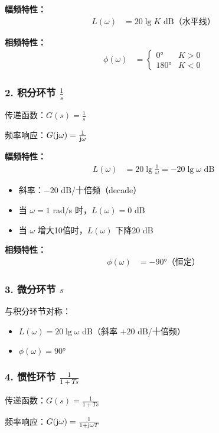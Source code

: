 \textbf{幅频特性：}
\begin{align*}
L(\omega) &= 20\lg K \text{ dB（水平线）}
\end{align*}

\textbf{相频特性：}
\begin{align*}
\phi(\omega) &= \begin{cases}
0° & K > 0 \\
180° & K < 0
\end{cases}
\end{align*}

\subsubsection{2. 积分环节 $\frac{1}{s}$}
传递函数：$G(s) = \frac{1}{s}$

频率响应：$G(\mathrm{j}\omega) = \frac{1}{\mathrm{j}\omega}$

\textbf{幅频特性：}
\begin{align*}
L(\omega) &= 20\lg\frac{1}{\omega} = -20\lg\omega \text{ dB}
\end{align*}
\begin{itemize}
    \item 斜率：$-20$ dB/十倍频（decade）
    \item 当 $\omega = 1$ rad/s 时，$L(\omega) = 0$ dB
    \item 当 $\omega$ 增大10倍时，$L(\omega)$ 下降20 dB
\end{itemize}

\textbf{相频特性：}
\begin{align*}
\phi(\omega) &= -90°\text{（恒定）}
\end{align*}

\subsubsection{3. 微分环节 $s$}
与积分环节对称：
\begin{itemize}
    \item $L(\omega) = 20\lg\omega$ dB（斜率 $+20$ dB/十倍频）
    \item $\phi(\omega) = 90°$
\end{itemize}

\subsubsection{4. 惯性环节 \texorpdfstring{$\frac{1}{1+Ts}$}{1/(1+Ts)}}
传递函数：$G(s) = \frac{1}{1+Ts}$

频率响应：$G(\mathrm{j}\omega) = \frac{1}{1+\mathrm{j}\omega T}$

